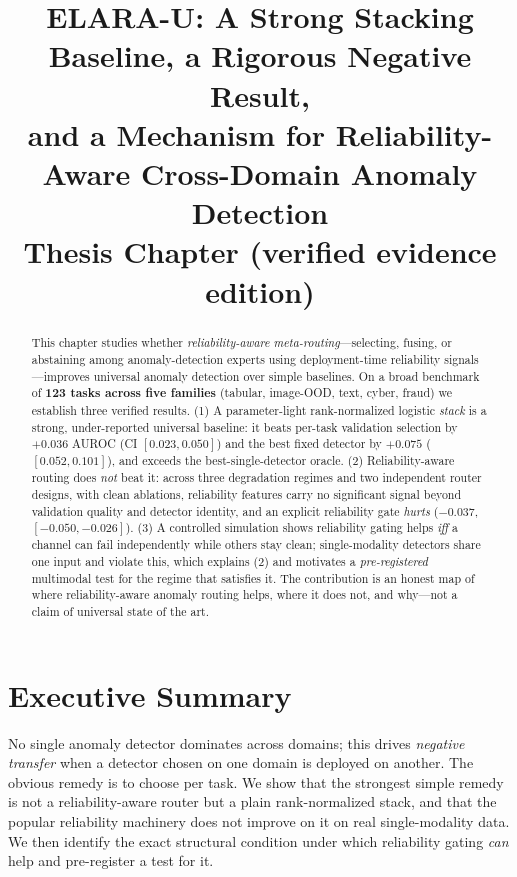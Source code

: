 \documentclass[11pt]{article}
\title{\textbf{ELARA-U: A Strong Stacking Baseline, a Rigorous Negative Result,\\
and a Mechanism for Reliability-Aware Cross-Domain Anomaly Detection}\\[4pt]
\large Thesis Chapter (verified evidence edition)}
\author{}
\date{}
\begin{document}
\maketitle

\begin{abstract}
This chapter studies whether \emph{reliability-aware meta-routing}---selecting,
fusing, or abstaining among anomaly-detection experts using deployment-time
reliability signals---improves universal anomaly detection over simple baselines. On
a broad benchmark of \textbf{123 tasks across five families} (tabular, image-OOD,
text, cyber, fraud) we establish three verified results. (1) A parameter-light
rank-normalized logistic \emph{stack} is a strong, under-reported universal baseline:
it beats per-task validation selection by $+0.036$ AUROC (CI $[0.023,0.050]$) and the
best fixed detector by $+0.075$ ($[0.052,0.101]$), and exceeds the best-single-detector
oracle. (2) Reliability-aware routing does \emph{not} beat it: across three
degradation regimes and two independent router designs, with clean ablations,
reliability features carry no significant signal beyond validation quality and
detector identity, and an explicit reliability gate \emph{hurts} ($-0.037$,
$[-0.050,-0.026]$). (3) A controlled simulation shows reliability gating helps
\emph{iff} a channel can fail independently while others stay clean; single-modality
detectors share one input and violate this, which explains (2) and motivates a
\emph{pre-registered} multimodal test for the regime that satisfies it. The
contribution is an honest map of where reliability-aware anomaly routing helps, where
it does not, and why---not a claim of universal state of the art.
\end{abstract}

\section{Executive Summary}
No single anomaly detector dominates across domains; this drives \emph{negative
transfer} when a detector chosen on one domain is deployed on another. The obvious
remedy is to choose per task. We show that the strongest simple remedy is not a
reliability-aware router but a plain rank-normalized stack, and that the popular
reliability machinery does not improve on it on real single-modality data. We then
identify the exact structural condition under which reliability gating \emph{can}
help and pre-register a test for it.
\end{document}
